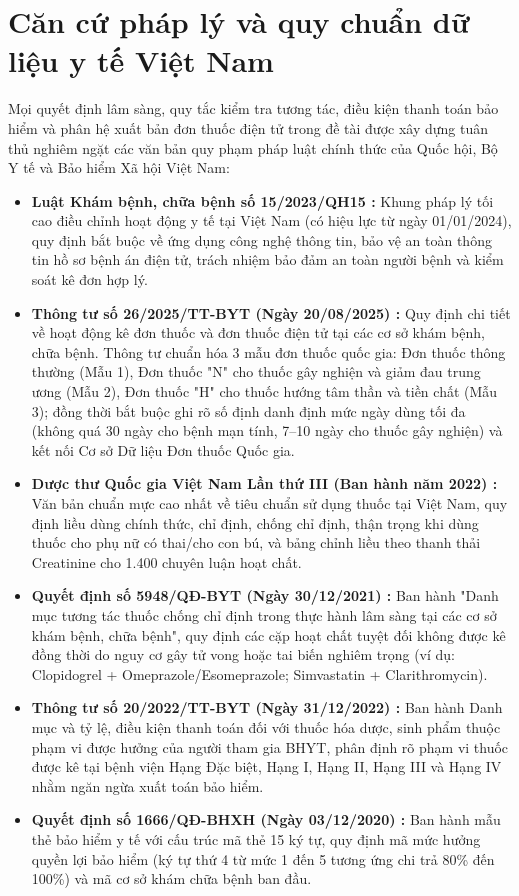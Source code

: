 \section{Căn cứ pháp lý và quy chuẩn dữ liệu y tế Việt Nam}
\label{sec:legal_regulations}

Mọi quyết định lâm sàng, quy tắc kiểm tra tương tác, điều kiện thanh toán bảo hiểm và phân hệ xuất bản đơn thuốc điện tử trong đề tài được xây dựng tuân thủ nghiêm ngặt các văn bản quy phạm pháp luật chính thức của Quốc hội, Bộ Y tế và Bảo hiểm Xã hội Việt Nam:

\begin{itemize}[leftmargin=1.5em]
    \item \textbf{Luật Khám bệnh, chữa bệnh số 15/2023/QH15 \cite{luat_kbcb_2023}:} Khung pháp lý tối cao điều chỉnh hoạt động y tế tại Việt Nam (có hiệu lực từ ngày 01/01/2024), quy định bắt buộc về ứng dụng công nghệ thông tin, bảo vệ an toàn thông tin hồ sơ bệnh án điện tử, trách nhiệm bảo đảm an toàn người bệnh và kiểm soát kê đơn hợp lý.
    \item \textbf{Thông tư số 26/2025/TT-BYT (Ngày 20/08/2025) \cite{tt26_2025_byt}:} Quy định chi tiết về hoạt động kê đơn thuốc và đơn thuốc điện tử tại các cơ sở khám bệnh, chữa bệnh. Thông tư chuẩn hóa 3 mẫu đơn thuốc quốc gia: Đơn thuốc thông thường (Mẫu 1), Đơn thuốc "N" cho thuốc gây nghiện và giảm đau trung ương (Mẫu 2), Đơn thuốc "H" cho thuốc hướng tâm thần và tiền chất (Mẫu 3); đồng thời bắt buộc ghi rõ số định danh định mức ngày dùng tối đa (không quá 30 ngày cho bệnh mạn tính, 7--10 ngày cho thuốc gây nghiện) và kết nối Cơ sở Dữ liệu Đơn thuốc Quốc gia.
    \item \textbf{Dược thư Quốc gia Việt Nam Lần thứ III (Ban hành năm 2022) \cite{dtqg_2022}:} Văn bản chuẩn mực cao nhất về tiêu chuẩn sử dụng thuốc tại Việt Nam, quy định liều dùng chính thức, chỉ định, chống chỉ định, thận trọng khi dùng thuốc cho phụ nữ có thai/cho con bú, và bảng chỉnh liều theo thanh thải Creatinine cho 1.400 chuyên luận hoạt chất.
    \item \textbf{Quyết định số 5948/QĐ-BYT (Ngày 30/12/2021) \cite{qd5948_byt}:} Ban hành "Danh mục tương tác thuốc chống chỉ định trong thực hành lâm sàng tại các cơ sở khám bệnh, chữa bệnh", quy định các cặp hoạt chất tuyệt đối không được kê đồng thời do nguy cơ gây tử vong hoặc tai biến nghiêm trọng (ví dụ: Clopidogrel + Omeprazole/Esomeprazole; Simvastatin + Clarithromycin).
    \item \textbf{Thông tư số 20/2022/TT-BYT (Ngày 31/12/2022) \cite{tt20_2022_byt}:} Ban hành Danh mục và tỷ lệ, điều kiện thanh toán đối với thuốc hóa dược, sinh phẩm thuộc phạm vi được hưởng của người tham gia BHYT, phân định rõ phạm vi thuốc được kê tại bệnh viện Hạng Đặc biệt, Hạng I, Hạng II, Hạng III và Hạng IV nhằm ngăn ngừa xuất toán bảo hiểm.
    \item \textbf{Quyết định số 1666/QĐ-BHXH (Ngày 03/12/2020) \cite{qd1666_bhxh}:} Ban hành mẫu thẻ bảo hiểm y tế với cấu trúc mã thẻ 15 ký tự, quy định mã mức hưởng quyền lợi bảo hiểm (ký tự thứ 4 từ mức 1 đến 5 tương ứng chi trả 80\% đến 100\%) và mã cơ sở khám chữa bệnh ban đầu.
\end{itemize}
